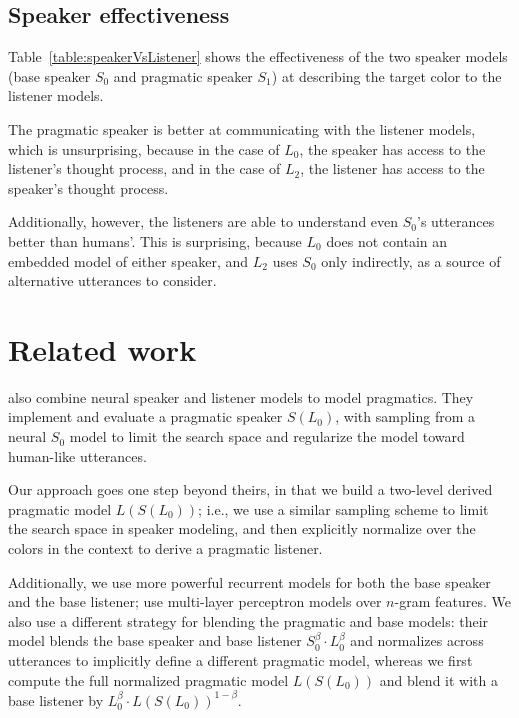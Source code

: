 \documentclass[11pt,letterpaper]{article}
\newcommand{\Listener}{L}
\newcommand{\Speaker}{S}
\renewcommand{\|}{\mid}
\newcommand{\Tabref}[1]{Table~\ref{#1}}
\begin{document}
\subsection{Speaker effectiveness}

\Tabref{table:speakerVsListener} shows the effectiveness of the two speaker models
(base speaker $\Speaker_0$ and pragmatic speaker $\Speaker_1$) at describing the
target color to the listener models.

The pragmatic speaker is better at communicating
with the listener models, which is unsurprising, because in the case of
$\Listener_0$, the speaker has access to the listener's thought process, and in
the case of $\Listener_2$, the listener has access to the speaker's thought process.

Additionally, however, the listeners are able to understand even $\Speaker_0$'s
utterances better than humans'. This is surprising, because $\Listener_0$ does not
contain an embedded model of either speaker, and $\Listener_2$ uses $\Speaker_0$
only indirectly, as a source of alternative utterances to consider.

\section{Related work}

 also combine neural speaker and listener
models to model pragmatics. They implement and evaluate a pragmatic speaker
$\Speaker(\Listener_0)$, with sampling from a neural $\Speaker_0$ model to limit
the search space and regularize the model toward human-like utterances.

Our approach goes one step beyond theirs, in that we build a two-level derived
pragmatic model $\Listener(\Speaker(\Listener_0))$; i.e., we use a similar sampling
scheme to limit the search space in speaker modeling, and then explicitly normalize
over the colors in the context to derive a pragmatic listener.

Additionally, we use more powerful recurrent models for both the base speaker and the
base listener;  use multi-layer perceptron
models over $n$-gram features. We also use a different strategy for blending the
pragmatic and base models: their model blends the base speaker and base listener
$\Speaker_0^{\beta} \cdot \Listener_0^{\beta}$ and
normalizes across utterances to implicitly define a different pragmatic model,
whereas we first compute the full normalized pragmatic
model $\Listener(\Speaker(\Listener_0))$ and blend it with a base listener by
$\Listener_0^{\beta} \cdot \Listener(\Speaker(\Listener_0))^{1 - \beta}$.
\end{document}
